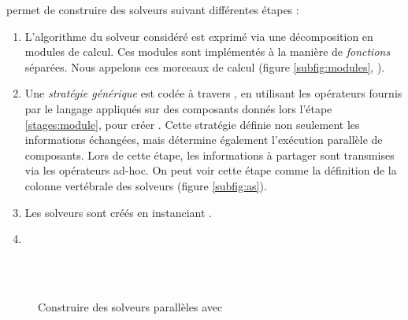 \posl{} permet de construire des solveurs suivant différentes étapes : 
\begin{enumerate}
\item  L'algorithme du solveur considéré est  exprimé via une décomposition  en modules de calcul. Ces modules sont implémentés à la   manière de {\it fonctions} séparées. Nous appelons \INTROom{} ces morceaux de calcul (figure \ref{subfig:modules}, ).  \label{stages:module}

\item  Une {\it stratégie générique}  est codée  à travers  \posl{}, en utilisant les  opérateurs fournis par le langage appliqués  sur des  composants donnés lors l'étape \ref{stages:module}, pour créer \INTROass. Cette stratégie définie non seulement les informations échangées, mais détermine également l'exécution parallèle de composants. Lors  de cette  étape, les informations à partager sont  transmises via les opérateurs  ad-hoc. On peut voir cette étape comme la définition de la colonne vertébrale des solveurs (figure \ref{subfig:as}).

\item  Les solveurs sont créés en instanciant . %

\item {}
\end{enumerate}

\begin{figure}
	\centering
	\\
	\\
	\caption[]{Construire des solveurs parallèles avec \posl{}}
	\label{fig:posl}
\end{figure}%


